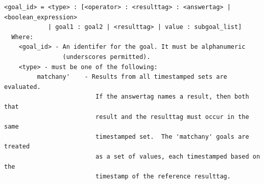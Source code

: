 \documentclass[12pt]{article}
\begin{document}
\begin{verbatim}
<goal_id> = <type> : [<operator> : <resulttag> : <answertag> | <boolean_expression> 
            | goal1 : goal2 | <resulttag> | value : subgoal_list]
  Where: 
    <goal_id> - An identifer for the goal. It must be alphanumeric 
                (underscores permitted).
    <type> - must be one of the following:
         matchany'    - Results from all timestamped sets are evaluated.
                         If the answertag names a result, then both that 
                         result and the resulttag must occur in the same 
                         timestamped set.  The 'matchany' goals are treated 
                         as a set of values, each timestamped based on the 
                         timestamp of the reference resulttag.
                      

\end{verbatim}
\end{document}
